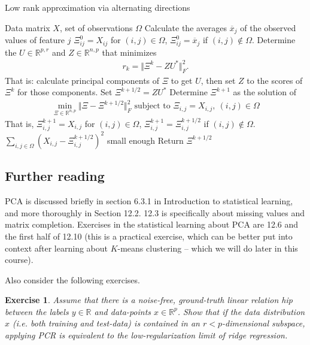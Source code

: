 \documentclass{article}
\newcommand{\R}{\mathbb{R}}
\newtheorem{exercise}{Exercise}
\newcommand{\norm}[1]{\Vert #1 \Vert}
\begin{document}
 \begin{algorithm}[tb]      
	\caption{Low rank approximation via alternating directions} 
	\label{alg:LowRank}
	\begin{algorithmic} [1]
 		\REQUIRE Data matrix $X$,  set of observations $\Omega$
        \STATE Calculate the averages $\overline{x}_j$ of the observed values of feature $j$
 		\STATE $\Xi^0_{ij}=X_{ij}$ for $(i,j)\in \Omega$, $\Xi^0_{ij}=\overline{x}_j$ if $(i,j)\notin \Omega$.
 		\REPEAT
 			\STATE Determine the $U \in \R^{p,r}$ and $Z \in \R^{n,p}$ that minimizes
            \begin{align*}
                r_k = \norm{\Xi^k-ZU^*}_F^2.
            \end{align*}
            That is: calculate principal components of $\Xi$ to get $U$, then set $Z$ to the scores of $\Xi^k$ for those components. Set $\Xi^{k+1/2}=ZU^*$
            \STATE Determine $\Xi^{k+1}$ as the solution of
            \begin{align*}
                \min_{\Xi \in \R^{n,p}}\norm{\Xi-\Xi^{k+1/2}}_F^2 \text{ subject to } \Xi_{i,j}=X_{i,j}, \ (i,j) \in \Omega
            \end{align*}
            That is, $\Xi^{k+1}_{i,j}=X_{i,j}$ for $(i,j)\in \Omega$, $\Xi^{k+1}_{i,j}=\Xi^{k+1/2}_{i,j}$ if $(i,j) \notin \Omega$.
 		\UNTIL $\sum_{i,j\in \Omega}(X_{i,j}-\Xi^{k+1/2}_{i,j})^2 $ small enough
 		\RETURN Return $\Xi^{k+1/2}$
	\end{algorithmic}
\end{algorithm}

\subsection{Further reading}
PCA is discussed briefly in section 6.3.1 in Introduction to statistical learning, and more thoroughly in Section 12.2. 12.3 is specifically about missing values and matrix completion. Exercises in the statistical learning about PCA are 12.6 and the first half of 12.10 (this is a practical exercise, which can be better put into context after learning about $K$-means clustering -- which we will do later in this course).

Also consider the following exercises.

\begin{exercise}
    Assume that there is a noise-free, ground-truth linear relation hip between the labels $y \in \R$ and data-points $x\in\R^p$. Show that if the data distribution $x$ (i.e. both training and test-data) is contained in an $r<p$-dimensional subspace, applying PCR is equivalent to the low-regularization limit of ridge regression.  
\end{exercise}
\end{document}

